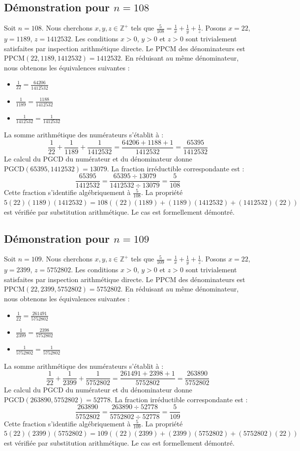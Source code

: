 \documentclass[12pt,a4paper]{article}
\begin{document}
\subsection{Démonstration pour $n = 108$}
Soit $n = 108$. Nous cherchons $x, y, z \in \mathbb{Z}^{+}$ tels que $\frac{5}{108} = \frac{1}{x} + \frac{1}{y} + \frac{1}{z}$.
Posons $x = 22$, $y = 1189$, $z = 1412532$.
Les conditions $x > 0$, $y > 0$ et $z > 0$ sont trivialement satisfaites par inspection arithmétique directe.
Le PPCM des dénominateurs est $\text{PPCM}(22, 1189, 1412532) = 1412532$.
En réduisant au même dénominateur, nous obtenons les équivalences suivantes :
\begin{itemize}
    \item $\frac{1}{22} = \frac{64206}{1412532}$
    \item $\frac{1}{1189} = \frac{1188}{1412532}$
    \item $\frac{1}{1412532} = \frac{1}{1412532}$
\end{itemize}
La somme arithmétique des numérateurs s'établit à :
$$ \frac{1}{22} + \frac{1}{1189} + \frac{1}{1412532} = \frac{64206 + 1188 + 1}{1412532} = \frac{65395}{1412532} $$
Le calcul du PGCD du numérateur et du dénominateur donne $\text{PGCD}(65395, 1412532) = 13079$.
La fraction irréductible correspondante est :
$$ \frac{65395}{1412532} = \frac{65395 \div 13079}{1412532 \div 13079} = \frac{5}{108} $$
Cette fraction s'identifie algébriquement à $\frac{5}{108}$.
La propriété $5(22)(1189)(1412532) = 108((22)(1189) + (1189)(1412532) + (1412532)(22))$ est vérifiée par substitution arithmétique.
Le cas est formellement démontré.

\subsection{Démonstration pour $n = 109$}
Soit $n = 109$. Nous cherchons $x, y, z \in \mathbb{Z}^{+}$ tels que $\frac{5}{109} = \frac{1}{x} + \frac{1}{y} + \frac{1}{z}$.
Posons $x = 22$, $y = 2399$, $z = 5752802$.
Les conditions $x > 0$, $y > 0$ et $z > 0$ sont trivialement satisfaites par inspection arithmétique directe.
Le PPCM des dénominateurs est $\text{PPCM}(22, 2399, 5752802) = 5752802$.
En réduisant au même dénominateur, nous obtenons les équivalences suivantes :
\begin{itemize}
    \item $\frac{1}{22} = \frac{261491}{5752802}$
    \item $\frac{1}{2399} = \frac{2398}{5752802}$
    \item $\frac{1}{5752802} = \frac{1}{5752802}$
\end{itemize}
La somme arithmétique des numérateurs s'établit à :
$$ \frac{1}{22} + \frac{1}{2399} + \frac{1}{5752802} = \frac{261491 + 2398 + 1}{5752802} = \frac{263890}{5752802} $$
Le calcul du PGCD du numérateur et du dénominateur donne $\text{PGCD}(263890, 5752802) = 52778$.
La fraction irréductible correspondante est :
$$ \frac{263890}{5752802} = \frac{263890 \div 52778}{5752802 \div 52778} = \frac{5}{109} $$
Cette fraction s'identifie algébriquement à $\frac{5}{109}$.
La propriété $5(22)(2399)(5752802) = 109((22)(2399) + (2399)(5752802) + (5752802)(22))$ est vérifiée par substitution arithmétique.
Le cas est formellement démontré.
\end{document}
